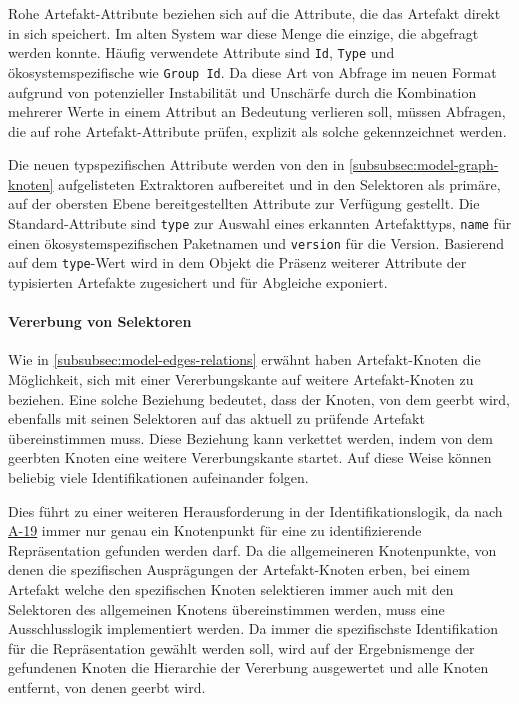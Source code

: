 Rohe Artefakt-Attribute beziehen sich auf die Attribute, die das Artefakt direkt in sich speichert.
Im alten System war diese Menge die einzige, die abgefragt werden konnte.
Häufig verwendete Attribute sind \texttt{Id}, \texttt{Type} und ökosystemspezifische wie \texttt{Group Id}.
Da diese Art von Abfrage im neuen Format aufgrund von potenzieller Instabilität und Unschärfe durch die Kombination mehrerer Werte in einem Attribut an Bedeutung verlieren soll, müssen Abfragen, die auf rohe Artefakt-Attribute prüfen, explizit als solche gekennzeichnet werden.

Die neuen typspezifischen Attribute werden von den in \autoref{subsubsec:model-graph-knoten} aufgelisteten Extraktoren aufbereitet und in den Selektoren als primäre, auf der obersten Ebene bereitgestellten Attribute zur Verfügung gestellt.
Die Standard-Attribute sind \texttt{type} zur Auswahl eines erkannten Artefakttyps, \texttt{name} für einen ökosystemspezifischen Paketnamen und \texttt{version} für die Version.
Basierend auf dem \texttt{type}-Wert wird in dem Objekt die Präsenz weiterer Attribute der typisierten Artefakte zugesichert und für Abgleiche exponiert.

\paragraph{Vererbung von Selektoren}

Wie in \autoref{subsubsec:model-edges-relations} erwähnt haben Artefakt-Knoten die Möglichkeit, sich mit einer Vererbungskante auf weitere Artefakt-Knoten zu beziehen.
Eine solche Beziehung bedeutet, dass der Knoten, von dem geerbt wird, ebenfalls mit seinen Selektoren auf das aktuell zu prüfende Artefakt übereinstimmen muss.
Diese Beziehung kann verkettet werden, indem von dem geerbten Knoten eine weitere Vererbungskante startet.
Auf diese Weise können beliebig viele Identifikationen aufeinander folgen.

Dies führt zu einer weiteren Herausforderung in der Identifikationslogik, da nach \hyperref[subsec:req-graph-inner-consistency]{A-19} immer nur genau ein Knotenpunkt für eine zu identifizierende Repräsentation gefunden werden darf.
Da die allgemeineren Knotenpunkte, von denen die spezifischen Ausprägungen der Artefakt-Knoten erben, bei einem Artefakt welche den spezifischen Knoten selektieren immer auch mit den Selektoren des allgemeinen Knotens übereinstimmen werden, muss eine Ausschlusslogik implementiert werden.
Da immer die spezifischste Identifikation für die Repräsentation gewählt werden soll, wird auf der Ergebnismenge der gefundenen Knoten die Hierarchie der Vererbung ausgewertet und alle Knoten entfernt, von denen geerbt wird.

